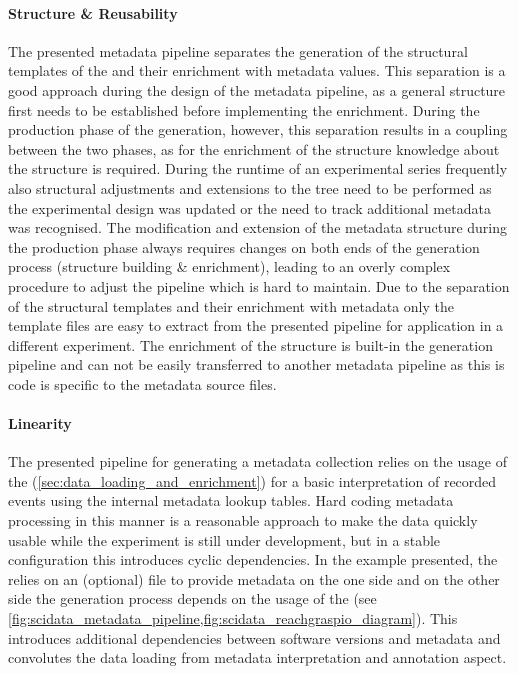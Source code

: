 \paragraph{Structure \& Reusability} The presented metadata pipeline separates the generation of the structural templates of the  and their enrichment with metadata values. This separation is a good approach during the design of the metadata pipeline, as a general structure first needs to be established before implementing the enrichment. During the production phase of the  generation, however, this separation results in a coupling between the two phases, as for the enrichment of the  structure knowledge about the structure is required. During the runtime of an experimental series frequently also structural adjustments and extensions to the  tree need to be performed as the experimental design was updated or the need to track additional metadata was recognised. The modification and extension of the metadata structure during the production phase always requires changes on both ends of the  generation process (structure building \& enrichment), leading to an overly complex procedure to adjust the pipeline which is hard to maintain.
Due to the separation of the structural templates and their enrichment with metadata only the template  files are easy to extract from the presented pipeline for application in a different experiment. The enrichment of the structure is built-in the  generation pipeline and can not be easily transferred to another metadata pipeline as this is code is specific to the metadata source files.

\paragraph{Linearity}
The presented pipeline for generating a metadata collection relies on the usage of the  (\cref{sec:data_loading_and_enrichment}) for a basic interpretation of recorded events using the internal metadata lookup tables. Hard coding metadata processing in this manner is a reasonable approach to make the data quickly usable while the experiment is still under development, but in a stable configuration this introduces cyclic dependencies. In the example presented, the  relies on an (optional)  file to provide metadata on the one side and on the other side the  generation process depends on the usage of the  (see \cref{fig:scidata_metadata_pipeline,fig:scidata_reachgraspio_diagram}). This introduces additional dependencies between software versions and metadata and convolutes the data loading from metadata interpretation and annotation aspect.

